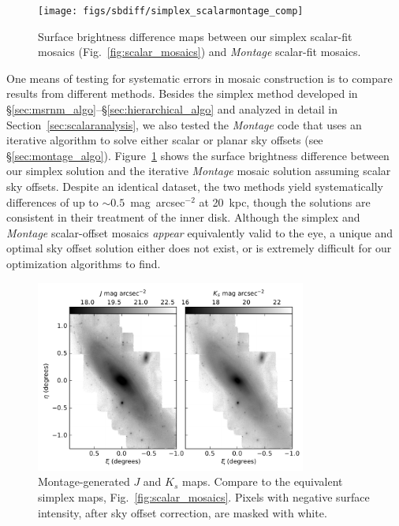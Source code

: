 \documentclass[iop]{emulateapj}
\newcommand{\sw}[1]{\textit{#1}} %
\newcommand{\Fig}[1]{Fig.~\ref{fig:#1}}  %
\newcommand{\Sec}[1]{\S\ref{sec:#1}}  %
\begin{document}
\begin{figure}[t]
    \centering
        \texttt{[image: figs/sbdiff/simplex\_scalarmontage\_comp]}
        \caption{Surface brightness difference maps between our simplex scalar-fit mosaics (\Fig{scalar_mosaics}) and \sw{Montage} scalar-fit mosaics.}
    \label{fig:simplex_scalarmontage_comp}
\end{figure}

One means of testing for systematic errors in mosaic construction is to compare results from different methods.
Besides the simplex method developed in \Sec{msrnm_algo}--\Sec{hierarchical_algo} and analyzed in detail in Section~\ref{sec:scalaranalysis}, we also tested the \sw{Montage} code that uses an iterative algorithm to solve either scalar or planar sky offsets (see \Sec{montage_algo}).
Figure~\ref{fig:simplex_scalarmontage_comp} shows the surface brightness difference between our simplex solution and the iterative \sw{Montage} mosaic solution assuming scalar sky offsets.
Despite an identical dataset, the two methods yield systematically differences of up to $\sim 0.5$~mag~arcsec$^{-2}$ at 20~kpc, though the solutions are consistent in their treatment of the inner disk.
Although the simplex and \sw{Montage} scalar-offset mosaics \emph{appear} equivalently valid to the eye, a unique and optimal sky offset solution either does not exist, or is extremely difficult for our optimization algorithms to find.

\begin{figure}[t]
\centering
\includegraphics[width=3.5in]{figs/montage_planar_mosaics}
\caption{Montage-generated $J$ and $K_s$ maps. Compare to the equivalent simplex maps, \Fig{scalar_mosaics}. Pixels with negative surface intensity, after sky offset correction, are masked with white.}
\label{fig:montage_planar_mosaics}
\end{figure}
\end{document}
